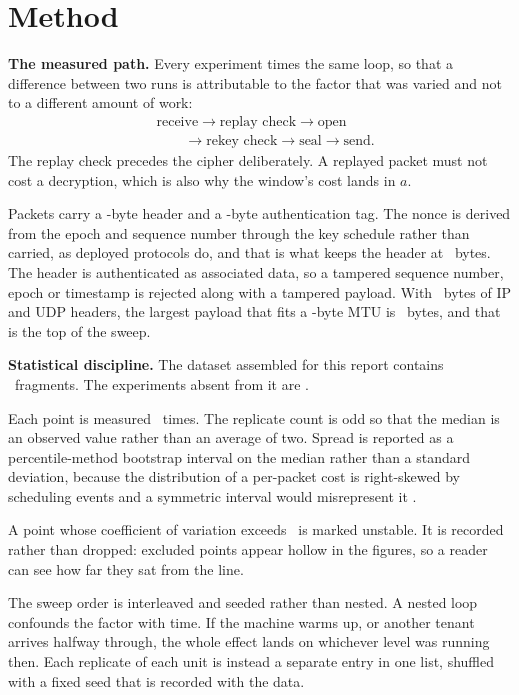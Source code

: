 \section{Method}
\label{sec:method}

\noindent\textbf{The measured path.}
Every experiment times the same loop, so that a difference between two runs is
attributable to the factor that was varied and not to a different amount of
work:
%
\[
\begin{aligned}
&\text{receive} \rightarrow \text{replay check} \rightarrow \text{open} \\
&\qquad \rightarrow \text{rekey check} \rightarrow \text{seal}
\rightarrow \text{send}.
\end{aligned}
\]
%
The replay check precedes the cipher deliberately. A replayed packet must not
cost a decryption, which is also why the window's cost lands in $a$.

Packets carry a \protoHeaderBytes-byte header and a \protoTagBytes-byte
authentication tag. The nonce is derived from the epoch and sequence number
through the key schedule rather than carried, as deployed protocols do, and that
is what keeps the header at \protoHeaderBytes\ bytes. The header is
authenticated as associated data, so a tampered sequence number, epoch or
timestamp is rejected along with a tampered payload. With
\protoIPUDPOverhead\ bytes of IP and UDP headers, the largest payload that fits
a \protoMTU-byte MTU is \protoMaxPayload\ bytes, and that is the top of the
sweep.

\noindent\textbf{Statistical discipline.}
The dataset assembled for this report contains \provFragments\ fragments. The
experiments absent from it are \provMissing.

Each point is measured \envReplicates\ times. The replicate count is odd so that
the median is an observed value rather than an average of two. Spread is
reported as a percentile-method bootstrap interval on the median rather than a
standard deviation, because the distribution of a per-packet cost is
right-skewed by scheduling events and a symmetric interval would misrepresent
it \cite{hoefler2015}.

A point whose coefficient of variation exceeds \envCVThreshold\ is marked
unstable. It is recorded rather than dropped: excluded points appear hollow in
the figures, so a reader can see how far they sat from the line.

The sweep order is interleaved and seeded rather than nested. A nested loop
confounds the factor with time. If the machine warms up, or another tenant
arrives halfway through, the whole effect lands on whichever level was running
then. Each replicate of each unit is instead a separate entry in one list,
shuffled with a fixed seed that is recorded with the data.


